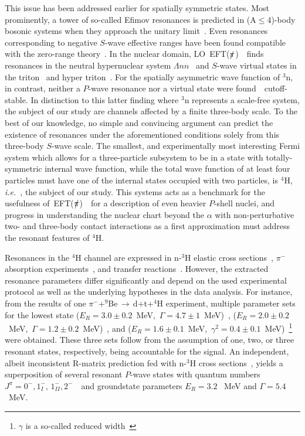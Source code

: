 \documentclass[5p,times]{elsarticle}
\newcommand{\ie}{\textit{i.e.}~}
\newcommand{\eftnopi}{\mbox{EFT($\slashed{\pi}$) }}
\begin{document}
This issue has been addressed earlier for spatially symmetric states.
Most prominently, a tower of so-called Efimov resonances is predicted in (A$\le$4)-body bosonic systems 
when they approach the unitary limit~\cite{Deltuva:2012ig,deltuva2020energies}. 
Even resonances corresponding to negative $S$-wave effective ranges have been found
compatible with the zero-range theory~\cite{Habashi:2020qgw}.
In the nuclear domain, LO~\eftnopi~finds resonances in the neutral
hypernuclear system $\Lambda nn$~\cite{Schafer:2020rba}
and $S$-wave virtual states in the triton~\cite{Rupak:2019} and hyper triton~\cite{Schafer:2020rba}. 
For the spatially asymmetric wave function of $^3$n, in contrast, neither
a $P$-wave resonance nor a virtual state
were found~\cite{Dietz:2021haj}~cutoff-stable.
In distinction to this latter finding where $^3$n represents a scale-free system,
the subject of our study are channels affected by a finite three-body scale. 
To the best of our knowledge, no simple and convincing argument
can predict the existence of resonances under the aforementioned conditions
solely from this three-body $S$-wave scale. 
The smallest, and experimentally most interesting Fermi system which allows for
a three-particle subsystem to be in a state with totally-symmetric internal wave function,
while the total wave function of at least four particles
must have one of the internal states occupied with two particles, is $^4$H, \ie, the subject of our study. 
This systems acts as a benchmark for the usefulness of~\eftnopi~for a description of even heavier
$P$-shell nuclei, and progress in understanding the nuclear chart beyond the $\alpha$ with
non-perturbative two- and three-body contact interactions as a first approximation must address the
resonant features of $^4$H.

%
Resonances in the $^4$H channel are expressed in n-$^3$H elastic cross sections~\cite{PhysRev.119.1981,SEAGRAVE1972250},
$\pi^-$ absorption experiments~\cite{Sennhauser:1981tr,Gornov:1991fg}, and transfer reactions~\cite{Miljanic:1986zz,Sidorchuk:2003fwa}. 
However, the extracted resonance parameters differ significantly and depend on the used experimental protocol as well as
the underlying hypotheses in the data analysis. 
For instance, from the results of one $\pi^-$+$^9$Be$\,\to\,$d+t+$^4$H
experiment, multiple parameter sets for the lowest state
($E_R=3.0\pm0.2$~MeV,~$\Gamma=4.7\pm1$~MeV)~\cite{Gornov:1991fg}, ($E_R=2.0\pm0.2$~MeV,~$\Gamma=1.2\pm0.2$~MeV)~\cite{Gurov:2005sp},
and ($E_R=1.6\pm0.1$~MeV,~$\gamma^2=0.4\pm0.1$~MeV)~\cite{Gurov2005p}\footnote{$\gamma$ is a so-called reduced width~\cite{Gurov2005p}}
were obtained. These three sets follow from the assumption of one, two, or three resonant states, respectively, being accountable for 
the signal.
An independent, albeit inconsistent R-matrix prediction fed with n-$^3$H cross sections~\cite{Tilley:1992zz}, yields
a superposition of several resonant $P$-wave states with quantum numbers $J^\pi=0^-,1^-_I$, $1^-_{II},2^-$~\cite{Lazauskas:2004uq}~and
groundstate parameters $E_R=3.2$~ MeV and $\Gamma=5.4$~MeV.
%
\end{document}
